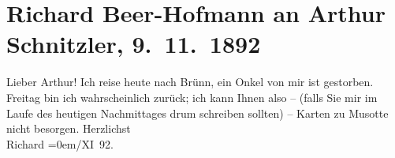 

         
         \renewcommand{\erwaehntePersonen}{Personen: Moritz E. Schwarz}
         \renewcommand{\erwaehnteOrte}{Orte: Brünn, Wien}
         \renewcommand{\erwaehnteWerke}{Werke: Musotte}
               \section[Richard Beer-Hofmann an Arthur Schnitzler, 9. 11. 1892]{ Richard Beer-Hofmann an Arthur Schnitzler, 9. 11. 1892}\nopagebreak{}\rehead{ }\begin{ledgroupsized}[t]{13cm}\normalsize\beginnumbering \toendnotes[C]{\smallbreak\pagebreak[2]} 
\toendnotes[C]{\smallbreak}\pstart{}{\pb}Lieber Arthur!\pend\pstart
           Ich reise heute nach Brünn, ein Onkel von mir ist gestorben.\pend
           \pstart
           Freitag bin ich wahrscheinlich zurück; ich kann Ihnen also – (falls {\pb}Sie mir im Laufe des heutigen
               Nachmittages drum schreiben sollten) – Karten zu Musotte nicht besorgen.\pend
           \pstart
           Herzlichst{\\[\baselineskip]}\spacefill\mbox{Richard}\pend
           \leftskip=0em{}/XI 92.\pend
           
         
         \endnumbering{}\end{ledgroupsized}  \newcommand{\dateiname}{L00134}\newcommand{\titel}{Richard Beer-Hofmann an Arthur Schnitzler, 9. 11. 1892}\newcommand{\editorInnen}{Martin Anton Müller und Gerd-Hermann Susen}
      